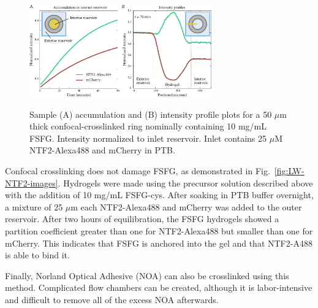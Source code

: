 \begin{figure} %
  \centering
  \caption[Influx plots for confocal-crosslinked hydrogel ring.]{Sample (A) accumulation and (B) intensity profile plots for a 50 $\mu$m thick confocal-crosslinked ring nominally containing 10 mg/mL FSFG. Intensity normalized to inlet reservoir.  Inlet contains 25 $\mu$M NTF2-Alexa488 and mCherry in PTB.\\}
  \includegraphics[width=0.7\textwidth]{figs/ch03/ring-acc-and-profile}
\label{fig:ring-acc-and-profile}
\end{figure} %

Confocal crosslinking does not damage FSFG, as demonstrated in Fig.~\ref{fig:LW-NTF2-images}.  Hydrogels were made using the precursor solution described above with the addition of 10 mg/mL FSFG-cys.  After soaking in PTB buffer overnight, a mixture of 25 $\mu$m each NTF2-Alexa488 and mCherry was added to the outer reservoir.  After two hours of equilibration, the FSFG hydrogels showed a partition coefficient greater than one for NTF2-Alexa488 but smaller than one for mCherry.  This indicates that FSFG is anchored into the gel and that NTF2-A488 is able to bind it.

Finally, Norland Optical Adhesive (NOA) can also be crosslinked using this method.  Complicated flow chambers can be created, although it is labor-intensive and difficult to remove all of the excess NOA afterwards.

